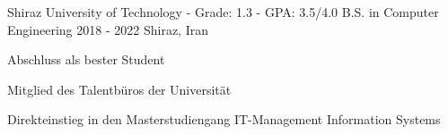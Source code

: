 \begin{cventries}

\cventry
  {Shiraz University of Technology - Grade: 1.3 - GPA: 3.5/4.0} %
  {B.S. in Computer Engineering} %
  {2018 - 2022} %
  {Shiraz, Iran} %
  {
    \begin{cvitems}
      \item {Abschluss als bester Student} 
      \item {Mitglied des Talentbüros der Universität} 
      \item {Direkteinstieg in den Masterstudiengang IT-Management Information Systems}
    \end{cvitems}
  }
\end{cventries}
